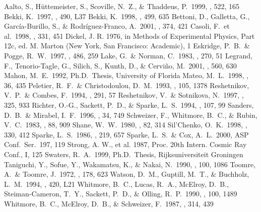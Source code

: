 \documentclass{aastex}
\begin{document}
\begin{thebibliography}{}
\bibitem{} Aalto, S., H{\" u}ttemeister, S., Scoville, N.~Z., \& Thaddeus, P.\ 1999, \apj, 522, 165
\bibitem{} Bekki, K.\ 1997, \apjl, 490, L37
\bibitem{} Bekki, K.\ 1998, \apj, 499, 635
\bibitem{} Bettoni, D., Galletta, G., Garc{\' i}a-Burillo, S., \& Rodr{\' i}guez-Franco, A.\ 2001, \aap, 374, 421 
\bibitem{} Casoli, F.~et al.\ 1998, \aap, 331, 451 
\bibitem{} Dickel, J. R. 1976, in Methods of Experimental Physics, Part 12c, ed. M. Marton (New York, San Francisco: Academic), 1 
\bibitem{} Eskridge, P.~B.~\& Pogge, R.~W.\ 1997, \apj, 486, 259 
\bibitem{} Lake, G.~\& Norman, C.\ 1983, \apj, 270, 51 
\bibitem{} Legrand, F., Tenorio-Tagle, G., Silich, S., Kunth, D., \& Cervi{\~ n}o, M.\ 2001, \apj, 560, 630 
\bibitem{} Mahon, M.~E.\ 1992, Ph.D.~Thesis, University of Florida 
\bibitem{} Mateo, M.~L.\ 1998, \araa, 36, 435 
\bibitem{} Peletier, R.~F.~\& Christodoulou, D.~M.\ 1993, \aj, 105, 1378
\bibitem{} Reshetnikov, V.~P.~\& Combes, F.\ 1994, \aap, 291, 57 
\bibitem{} Reshetnikov, V.~\& Sotnikova, N.\ 1997, \aap, 325, 933 
\bibitem{} Richter, O.-G., Sackett, P.~D., \& Sparke, L.~S.\ 1994, \aj, 107, 99
\bibitem{} Sanders, D.~B.~\& Mirabel, I.~F.\ 1996, \araa, 34, 749 
\bibitem{} Schweizer, F., Whitmore, B.~C., \& Rubin, V.~C.\ 1983, \aj, 88, 909 
\bibitem{} Shane, W.~W.\ 1980, \aap, 82, 314 
\bibitem{} Sil'Chenko, O.~K.\ 1998, \aap, 330, 412  
\bibitem{} Sparke, L.~S.\ 1986, \mnras, 219, 657 
\bibitem{} Sparke, L.~S.~\& Cox, A.~L.\ 2000, ASP Conf.~Ser.~197, 119 
\bibitem{} Strong, A. W., et al. 1987, Proc. 20th Intern. Cosmic Ray Conf., I, 125
\bibitem{} Swaters, R.~A.\ 1999, Ph.D.~Thesis, Rijksuniversiteit Groningen
\bibitem{} Taniguchi, Y., Sofue, Y., Wakamatsu, K., \& Nakai, N.\ 1990, \aj, 100, 1086 
\bibitem{} Toomre, A.~\& Toomre, J.\ 1972, \apj, 178, 623 
\bibitem{} Watson, D.~M., Guptill, M.~T., \& Buchholz, L.~M.\ 1994, \apjl, 420, L21 
\bibitem{} Whitmore, B.~C., Lucas, R.~A., McElroy, D.~B., Steiman-Cameron, T.~Y., Sackett, P.~D., \& Olling, R.~P.\ 1990, \aj, 100, 1489 
\bibitem{} Whitmore, B.~C., McElroy, D.~B., \& Schweizer, F.\ 1987, \apj, 314, 439 
\end{thebibliography}

\clearpage
\end{document}
